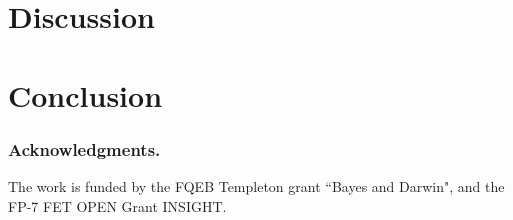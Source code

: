\documentclass[runningheads,a4paper]{llncs}
\begin{document}

\section{Discussion}
\section{Conclusion}

\subsubsection*{Acknowledgments.} The work is funded by the FQEB Templeton grant ``Bayes and Darwin", and the FP-7 FET OPEN Grant INSIGHT.



\end{document}
